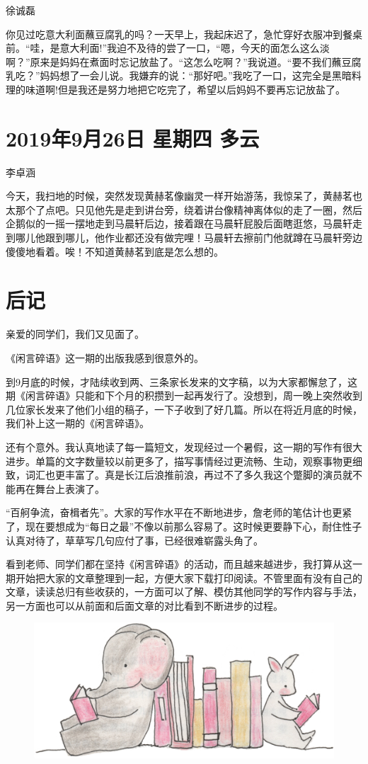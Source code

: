 徐诚磊

你见过吃意大利面蘸豆腐乳的吗？一天早上，我起床迟了，急忙穿好衣服冲到餐桌前。“哇，是意大利面!”我迫不及待的尝了一口，“嗯，今天的面怎么这么淡啊？”原来是妈妈在煮面时忘记放盐了。“这怎么吃啊？”我说道。“要不我们蘸豆腐乳吃？”妈妈想了一会儿说。我嫌弃的说：“那好吧。”我吃了一口，这完全是黑暗料理的味道啊!但是我还是努力地把它吃完了，希望以后妈妈不要再忘记放盐了。

\section{2019年9月26日 星期四 多云}

李卓涵

今天，我扫地的时候，突然发现黄赫茗像幽灵一样开始游荡，我惊呆了，黄赫茗也太那个了点吧。只见他先是走到讲台旁，绕着讲台像精神离体似的走了一圈，然后企鹅似的一摇一摆地走到马晨轩后边，接着跟在马晨轩屁股后面瞎逛悠，马晨轩走到哪儿他跟到哪儿，他作业都还没有做完哩！马晨轩去擦前门他就蹲在马晨轩旁边傻傻地看着。唉！不知道黄赫茗到底是怎么想的。

\section{后记}

亲爱的同学们，我们又见面了。

《闲言碎语》这一期的出版我感到很意外的。

到9月底的时候，才陆续收到两、三条家长发来的文字稿，以为大家都懈怠了，这期《闲言碎语》只能和下个月的积攒到一起再发行了。没想到，周一晚上突然收到几位家长发来了他们小组的稿子，一下子收到了好几篇。所以在将近月底的时候，我们补上这一期的《闲言碎语》。

还有个意外。我认真地读了每一篇短文，发现经过一个暑假，这一期的写作有很大进步。单篇的文字数量较以前更多了，描写事情经过更流畅、生动，观察事物更细致，词汇也更丰富了。真是长江后浪推前浪，再过不了多久我这个蹩脚的演员就不能再在舞台上表演了。

“百舸争流，奋楫者先”。大家的写作水平在不断地进步，詹老师的笔估计也更紧了，现在要想成为“每日之最”不像以前那么容易了。这时候更要静下心，耐住性子认真对待了，草草写几句应付了事，已经很难崭露头角了。

看到老师、同学们都在坚持《闲言碎语》的活动，而且越来越进步，我打算从这一期开始把大家的文章整理到一起，方便大家下载打印阅读。不管里面有没有自己的文章，读读总归有些收获的，一方面可以了解、模仿其他同学的写作内容与手法，另一方面也可以从前面和后面文章的对比看到不断进步的过程。

\begin{figure}[htb]
    \centering
    \includegraphics[width=\textwidth]{figure/02.png}
\end{figure}